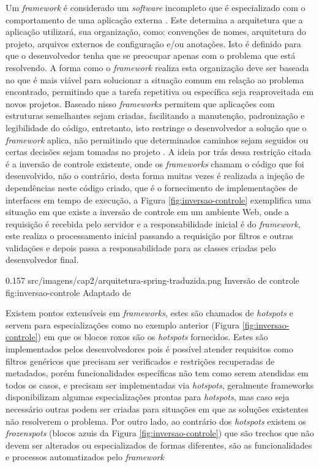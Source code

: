 \par Um \textit{framework} é considerado um \textit{software} incompleto que é especializado com o comportamento de uma aplicação externa \cite{johnson1988designing}. Este determina a arquitetura que a aplicação utilizará, sua organização, como: convenções de nomes, arquitetura do projeto, arquivos externos de configuração e/ou anotações. Isto é definido para que o desenvolvedor tenha que se preocupar apenas com o problema que está resolvendo. A forma como o \textit{framework} realiza esta organização deve ser baseada no que é mais viável para solucionar a situação comum em relação ao problema encontrado, permitindo que a tarefa repetitiva ou específica seja reaproveitada em novos projetos.
Baseado nisso \textit{frameworks} permitem que aplicações com estruturas semelhantes sejam criadas, facilitando a manutenção, padronização e legibilidade do código, entretanto, isto restringe o desenvolvedor a solução que o \textit{framework} aplica, não permitindo que determinados caminhos sejam seguidos ou certas decisões sejam tomadas no projeto \cite{gamma2009padroes}. A ideia por trás dessa restrição citada é a inversão de controle existente, onde os \textit{frameworks} chamam o código que foi desenvolvido, não o contrário, desta forma muitas vezes é realizada a injeção de dependências neste código criado, que é o fornecimento de implementações de interfaces em tempo de execução, a Figura \ref{fig:inversao-controle} exemplifica uma situação em que existe a inversão de controle em um ambiente Web, onde a requisição é recebida pelo servidor e a responsabilidade inicial é do \textit{framework}, este realiza o processamento inicial passando a requisição por filtros e outras validações e depois passa a responsabilidade para as classes criadas pelo desenvolvedor final.

\begin{image}
{0.157} %
{src/imagens/cap2/arquitetura-spring-traduzida.png} %
{Inversão de controle} %
{fig:inversao-controle} %
{Adaptado de } %
\end{image}

\par Existem pontos extensíveis em \textit{frameworks}, estes são chamados de \textit{hotspots} e servem para especializações como no exemplo anterior (Figura \ref{fig:inversao-controle}) em que os blocos roxos são os \textit{hotspots} fornecidos. Estes são implementados pelos desenvolvedores pois é possível atender requisitos como filtros genéricos que precisam ser verificados e restrições recuperadas de metadados, porém funcionalidades específicas não tem como serem atendidas em todos os casos, e precisam ser implementadas via \textit{hotspots}, geralmente frameworks disponibilizam algumas especializações prontas para \textit{hotspots}, mas caso seja necessário outras podem ser criadas para situações em que as soluções existentes não resolverem o problema. Por outro lado, ao contrário dos \textit{hotspots} existem os \textit{frozenspots} (blocos azuis da Figura \ref{fig:inversao-controle}) que são trechos que não devem ser alterados ou especializados de formas diferentes, são as funcionalidades e processos automatizados pelo \textit{framework} \cite{markiewicz2001object}

